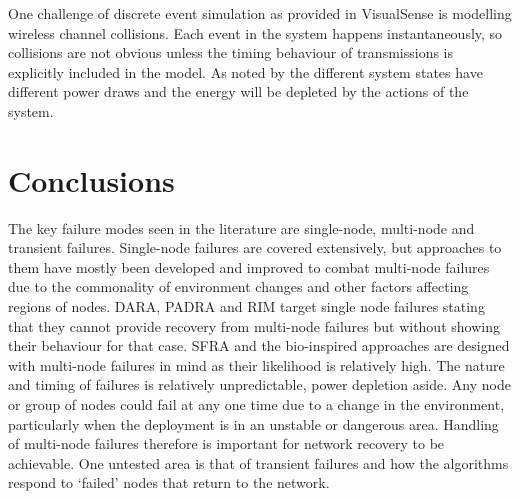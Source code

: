 \documentclass[authoryearcitations]{UoYCSproject}
\begin{document}
One challenge of discrete event simulation as provided in VisualSense is modelling wireless channel collisions. Each event in the system happens instantaneously, so collisions are not obvious unless the timing behaviour of transmissions is explicitly included in the model. As noted by \citeauthor{Rosello2009} the different system states have different power draws and the energy will be depleted by the actions of the system.



\section{Conclusions}







The key failure modes seen in the literature are single-node, multi-node and transient failures. Single-node failures are covered extensively, but approaches to them have mostly been developed and improved to combat multi-node failures due to the commonality of environment changes and other factors affecting regions of nodes. DARA, PADRA and RIM target single node failures stating that they cannot provide recovery from multi-node failures but without showing their behaviour for that case. SFRA and the bio-inspired approaches are designed with multi-node failures in mind as their likelihood is relatively high. The nature and timing of failures is relatively unpredictable, power depletion aside. Any node or group of nodes could fail at any one time due to a change in the environment, particularly when the deployment is in an unstable or dangerous area. Handling of multi-node failures therefore is important for network recovery to be achievable. One untested area is that of transient failures and how the algorithms respond to `failed' nodes that return to the network.
\end{document}
